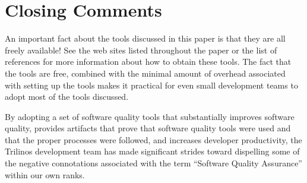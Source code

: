\documentclass[12pt,relax]{article}
\begin{document}
\section{Closing Comments}

An important fact about the tools discussed in this paper is that they are all 
freely available!  See the web sites listed throughout the paper or the list 
of references for more information about how to obtain these tools.  The fact 
that the tools are free, combined with the minimal amount of overhead 
associated with setting up the tools makes it practical for even small 
development teams to adopt most of the tools discussed.  

By adopting a set of software quality tools that substantially improves
software quality, provides artifacts that prove that software quality tools 
were used and that the proper processes were followed, and increases developer
productivity, the Trilinos development team has made significant strides 
toward dispelling some of the negative connotations associated with the term
``Software Quality Assurance'' within our own ranks.

\clearpage


%

\end{document}
